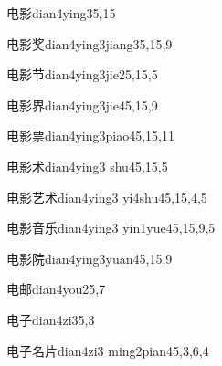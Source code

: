 \begin{verbete}{电影}{dian4ying3}{5,15}
\end{verbete}

\begin{verbete}{电影奖}{dian4ying3jiang3}{5,15,9}
\end{verbete}

\begin{verbete}{电影节}{dian4ying3jie2}{5,15,5}
\end{verbete}

\begin{verbete}{电影界}{dian4ying3jie4}{5,15,9}
\end{verbete}

\begin{verbete}{电影票}{dian4ying3piao4}{5,15,11}
\end{verbete}

\begin{verbete}{电影术}{dian4ying3 shu4}{5,15,5}
\end{verbete}

\begin{verbete}{电影艺术}{dian4ying3 yi4shu4}{5,15,4,5}
\end{verbete}

\begin{verbete}{电影音乐}{dian4ying3 yin1yue4}{5,15,9,5}
\end{verbete}

\begin{verbete}{电影院}{dian4ying3yuan4}{5,15,9}
\end{verbete}

\begin{verbete}{电邮}{dian4you2}{5,7}
\end{verbete}

\begin{verbete}{电子}{dian4zi3}{5,3}
\end{verbete}

\begin{verbete}{电子名片}{dian4zi3 ming2pian4}{5,3,6,4}
\end{verbete}

